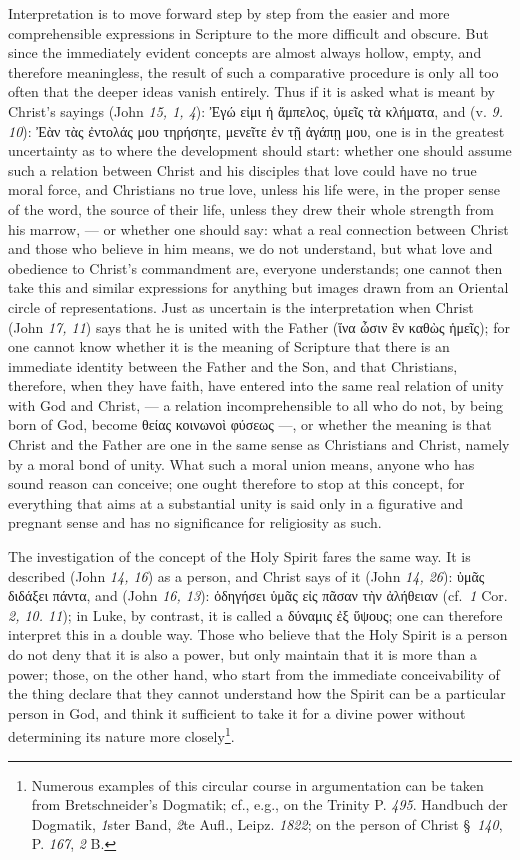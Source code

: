 \documentclass[12pt]{book}
\newcommand{\opage}[1]{\marginnote{\footnotesize\textit{[#1]}}}
\begin{document}
Interpretation is to move forward step by step from the easier and more
comprehensible expressions in Scripture to the more difficult and obscure. But
since the immediately evident concepts are almost always hollow, empty, and
therefore meaningless, the result of such a comparative procedure is only all
too often that the deeper ideas vanish entirely. Thus if it is asked what is
meant by Christ's sayings (John \textit{15, 1, 4}):
Ἐγώ εἰμι ἡ ἄμπελος, ὑμεῖς τὰ κλήματα, and (v. \textit{9. 10}): Ἐὰν τὰς
ἐντολάς μου τηρήσητε, μενεῖτε ἐν τῇ ἀγάπῃ μου, one is in the greatest
uncertainty as to where the development should start: whether one should
assume such a relation between Christ and his disciples that love could have no
true moral force, and Christians no true love, unless his life were, in the
proper sense of the word, the source of their life, unless they drew their
whole strength from his marrow, --- or whether one should say: what a real
connection between Christ and those who believe in him means, we do not
understand, but what love and obedience to Christ's commandment are, everyone
understands; one cannot then take this and similar expressions for anything
but images drawn from an Oriental circle of representations. Just as uncertain
is the interpretation when Christ (John \textit{17, 11}) says that he is united
with the Father (ἵνα ὦσιν ἓν καθὼς ἡμεῖς); for one cannot know whether it is
the meaning of Scripture that there is an immediate identity between the
Father and the Son, and that Christians, therefore, when they have faith, have
entered into the
\opage{111} \setcounter{footnote}{0}%
same real relation of unity with God and Christ, --- a relation
incomprehensible to all who do not, by being born of God, become θείας κοινωνοὶ
φύσεως ---, or whether the meaning is that Christ and the Father are one in
the same sense as Christians and Christ, namely by a moral bond of unity. What
such a moral union means, anyone who has sound reason can conceive; one ought
therefore to stop at this concept, for everything that aims at a substantial
unity is said only in a figurative and pregnant sense and has no significance
for religiosity as such.

The investigation of the concept of the Holy Spirit fares the same way. It is
described (John \textit{14, 16}) as a person, and Christ says of it (John
\textit{14, 26}): ὑμᾶς διδάξει πάντα, and (John \textit{16, 13}): ὁδηγήσει ὑμᾶς
εἰς πᾶσαν τὴν ἀλήθειαν (cf.\ \textit{1} Cor. \textit{2, 10. 11}); in Luke, by
contrast, it is called a δύναμις ἐξ ὕψους; one can therefore interpret this in
a double way. Those who believe that the Holy Spirit is a person do not deny
that it is also a power, but only maintain that it is more than a power; those,
on the other hand, who start from the immediate conceivability of the thing
declare that they cannot understand how the Spirit can be a particular person
in God, and think it sufficient to take it for a divine power without
determining its nature more closely\footnote{Numerous examples of this circular
course in argumentation can be taken from Bretschneider's Dogmatik; cf., e.g.,
on the Trinity P. \textit{495}. Handbuch der Dogmatik, \textit{1}ster Band,
\textit{2}te Aufl., Leipz. \textit{1822}; on the person of Christ §~\textit{140},
P. \textit{167}, \textit{2} B.}.
\end{document}
